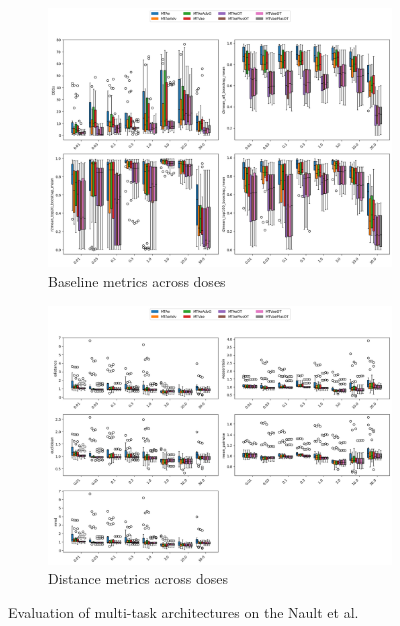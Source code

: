 \documentclass[12pt, a4paper]{article}
\begin{document}
\begin{figure}[h!]
    \begin{subfigure}[t]{0.48\textwidth}
        \centering
        \includegraphics[width=\textwidth]{multi_task_benchmarking_doses_baseline_metrics_nault.png}
        \caption{Baseline metrics across doses}
        \label{}
    \end{subfigure}
    \hfill
    \begin{subfigure}[t]{0.48\textwidth}
        \centering
        \includegraphics[width=\textwidth]{multi_task_benchmarking_doses_distance_metrics_nault.png}
        \caption{Distance metrics across doses}
        \label{}
    \end{subfigure}    
    \caption{Evaluation of multi-task architectures on the Nault et al. \cite{nault2021single,nault2022benchmarking}}
    \label{fig:all_multi_task_nault}
\end{figure}
\end{document}
